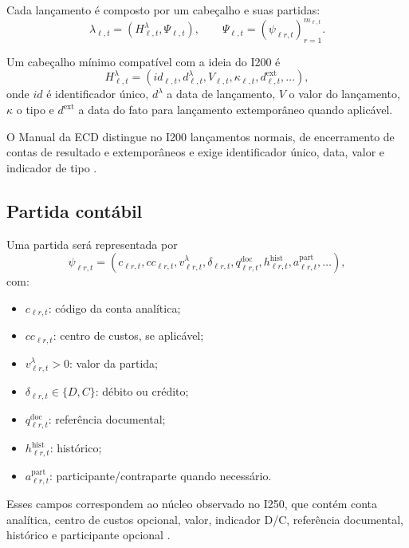 \documentclass[11pt,a4paper]{article}
\begin{document}
Cada lançamento é composto por um cabeçalho e suas partidas:
\begin{equation}
\boxed{
\lambda_{\ell,t}
=
\left(H^\lambda_{\ell,t},\Psi_{\ell,t}\right),
\qquad
\Psi_{\ell,t}=(\psi_{\ell r,t})_{r=1}^{m_{\ell,t}}.
}
\label{eq:entry-object}
\end{equation}

Um cabeçalho mínimo compatível com a ideia do I200 é
\begin{equation}
\boxed{
H^\lambda_{\ell,t}
=
(id_{\ell,t},d^\lambda_{\ell,t},V_{\ell,t},\kappa_{\ell,t},d^{\mathrm{ext}}_{\ell,t},\ldots),
}
\end{equation}
onde $id$ é identificador único, $d^\lambda$ a data de lançamento, $V$ o valor do lançamento, $\kappa$ o tipo e $d^{\mathrm{ext}}$ a data do fato para lançamento extemporâneo quando aplicável.

O Manual da ECD distingue no I200 lançamentos normais, de encerramento de contas de resultado e extemporâneos e exige identificador único, data, valor e indicador de tipo \cite{ECD2026}.

\subsection{Partida contábil}

Uma partida será representada por
\begin{equation}
\boxed{
\psi_{\ell r,t}
=
(c_{\ell r,t},cc_{\ell r,t},v^\lambda_{\ell r,t},\delta_{\ell r,t},
q^{\mathrm{doc}}_{\ell r,t},h^{\mathrm{hist}}_{\ell r,t},a^{\mathrm{part}}_{\ell r,t},\ldots),
}
\label{eq:posting}
\end{equation}
com:
\begin{itemize}
    \item $c_{\ell r,t}$: código da conta analítica;
    \item $cc_{\ell r,t}$: centro de custos, se aplicável;
    \item $v^\lambda_{\ell r,t}>0$: valor da partida;
    \item $\delta_{\ell r,t}\in\{D,C\}$: débito ou crédito;
    \item $q^{\mathrm{doc}}_{\ell r,t}$: referência documental;
    \item $h^{\mathrm{hist}}_{\ell r,t}$: histórico;
    \item $a^{\mathrm{part}}_{\ell r,t}$: participante/contraparte quando necessário.
\end{itemize}

Esses campos correspondem ao núcleo observado no I250, que contém conta analítica, centro de custos opcional, valor, indicador D/C, referência documental, histórico e participante opcional \cite{ECD2026}.
\end{document}
